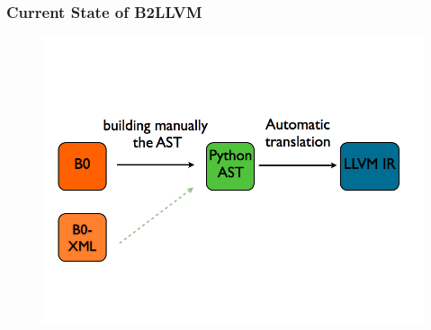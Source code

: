 \documentclass[12pt]{beamer}
\begin{document}
%
%

%
%



\begin{frame}[fragile]
\frametitle{Current State of B2LLVM}
	\begin{figure}[H]
               \includegraphics[width=.777\textwidth]{figures/CurrentState.png} 
	\end{figure}
\end{frame}
\end{document}
